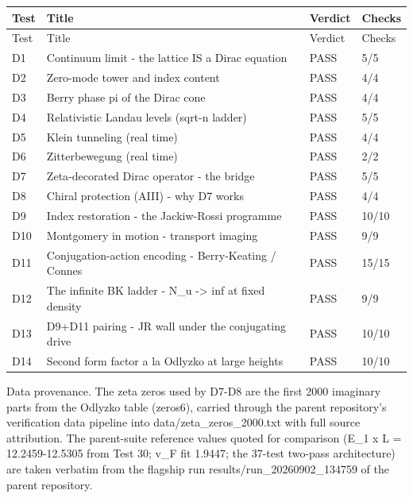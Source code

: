 \documentclass[11pt,a4paper]{article}
\begin{document}
{\small
\begin{longtable}{@{}p{}p{}p{}p{}@{}}
\toprule
Test & Title & Verdict & Checks \\
\midrule
\endfirsthead
\toprule
Test & Title & Verdict & Checks \\
\midrule
\endhead
\bottomrule
\endfoot
D1 & Continuum limit - the lattice IS a Dirac equation & PASS & 5/5 \\
D2 & Zero-mode tower and index content & PASS & 4/4 \\
D3 & Berry phase pi of the Dirac cone & PASS & 4/4 \\
D4 & Relativistic Landau levels (sqrt-n ladder) & PASS & 5/5 \\
D5 & Klein tunneling (real time) & PASS & 4/4 \\
D6 & Zitterbewegung (real time) & PASS & 2/2 \\
D7 & Zeta-decorated Dirac operator - the bridge & PASS & 5/5 \\
D8 & Chiral protection (AIII) - why D7 works & PASS & 4/4 \\
D9 & Index restoration - the Jackiw-Rossi programme & PASS & 10/10 \\
D10 & Montgomery in motion - transport imaging & PASS & 9/9 \\
D11 & Conjugation-action encoding - Berry-Keating / Connes & PASS & 15/15 \\
D12 & The infinite BK ladder - N\_\allowbreak{}u -> inf at fixed density & PASS & 9/9 \\
D13 & D9+D11 pairing - JR wall under the conjugating drive & PASS & 10/10 \\
D14 & Second form factor a la Odlyzko at large heights & PASS & 10/10 \\
\end{longtable}}

Data provenance. The zeta zeros used by D7-D8 are the first 2000 imaginary parts from the Odlyzko table (zeros6), carried through the parent repository's verification data pipeline into data/zeta\_\allowbreak{}zeros\_\allowbreak{}2000.txt with full source attribution. The parent-suite reference values quoted for comparison (E\_\allowbreak{}1 x L = 12.2459-12.5305 from Test 30; v\_\allowbreak{}F fit 1.9447; the 37-test two-pass architecture) are taken verbatim from the flagship run results/run\_\allowbreak{}20260902\_\allowbreak{}134759 of the parent repository.
\end{document}
